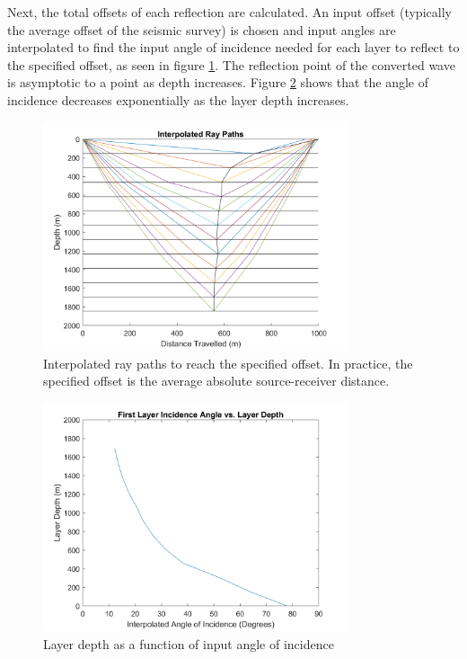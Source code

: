 \documentclass[12pt]{article}
\begin{document}
	Next, the total offsets of each reflection are calculated. An input offset (typically the average offset of the seismic survey) is chosen and input angles are interpolated to find the input angle of incidence needed for each layer to reflect to the specified offset, as seen in figure \ref{fig:RT3Interp}. The reflection point of the converted wave is asymptotic to a point as depth increases. Figure \ref{fig:RT3DVA} shows that the angle of incidence decreases exponentially as the layer depth increases.
	
\begin{figure}[!htb]
	\centering
	\includegraphics[width=0.8\textwidth]{Figures/RT3InterpolatedRayPath.png}
	\caption[Ray-tracing 3-layer fixed-offset path]{Interpolated ray paths to reach the specified offset. In practice, the specified offset is the average absolute source-receiver distance.}
	\label{fig:RT3Interp}
\end{figure}

\begin{figure}[!htb]
	\centering
	\includegraphics[width=0.8\textwidth]{Figures/RT3AnglevDepth.png}
	\caption[Ray-tracing 3-layer depth-angle plot]{Layer depth as a function of input angle of incidence}
	\label{fig:RT3DVA}
\end{figure}
\end{document}
